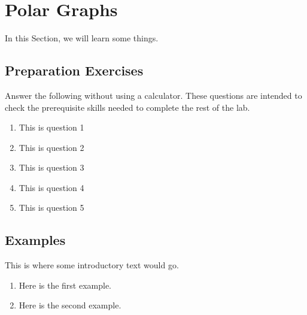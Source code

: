 
\section{Polar Graphs} \label{section-polar-graphs}
In this Section, we will learn some things.
\subsection*{Preparation Exercises} \label{preparation-exercises-section-polar-graphs}



\begin{myPrep}
Answer the following without using a calculator. These questions are intended to check the prerequisite skills needed to complete the rest of the lab.
	\begin{enumerate}
		\item This is question 1
		\vfill
		\item This is question 2
		\vfill
		\item This is question 3
		\vfill
		\item This is question 4
		\vfill
		\item This is question 5
		\vfill
	\end{enumerate}
\end{myPrep}
\vfill


\newpage

\subsection*{Examples} \label{examples-section-polar-graphs}

This is where some introductory text would go.

\begin{myExample}
\begin{enumerate}

\item Here is the first example.
\vfill

\item Here is the second example.
\vfill

\end{enumerate}
\end{myExample}

